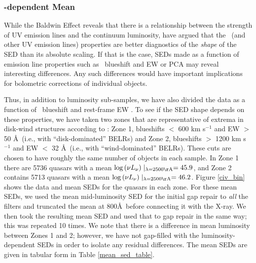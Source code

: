 \subsubsection{\civ-dependent Mean} \label{CIV SED}

While the Baldwin Effect \citep{Baldwin:1977} reveals that there is a relationship between the strength of UV emission lines and the continuum luminosity, \citet{Richards:2011} have argued that the \civ\ (and other UV emission lines) properties are better diagnostics of the {\em shape} of the SED than its absolute scaling.  If that is the case, SEDs made as a function of emission line properties such as \civ\ blueshift and EW \citep{Richards:2011} or PCA \citep[e.g., ``Eigenvector 1'';][]{Boroson:1992,Brotherton:1999} may reveal interesting differences.  Any such differences would have important implications for bolometric corrections of individual objects.

Thus, in addition to luminosity sub-samples, we have also divided the data as a function of \civ\ blueshift and rest-frame EW \citep{Richards:2011}.  To see if the SED shape depends on these properties, we have taken two zones that are representative of extrema in disk-wind structures according to \citet[][see also \citet{Wang:2011}]{Richards:2011}
:  Zone 1, blueshifts $<$ 600 km s$^{-1}$ and EW $>$ 50 \AA\ (i.e., with ``disk-dominated'' BELRs) and Zone 2, blueshifts $>$ 1200 km s$^{-1}$ and EW $<$ 32 \AA\ (i.e., with ``wind-dominated'' BELRs). 
These cuts are chosen to have roughly the same number of objects in each sample.
In Zone 1 there are 5736 quasars with a mean $\log{(\nu L_{\nu})}\mid_{\lambda=2500{\rm \AA}}=45.9$, and Zone 2 contains 5713 quasars with a mean $\log{(\nu L_{\nu})}\mid_{\lambda=2500{\rm \AA}}=46.2$.
Figure \ref{civ_bin} shows the data and mean SEDs for the quasars in each zone.  For these mean SEDs, we used the mean mid-luminosity SED for the initial gap repair to {\em all} the filters and truncated the mean at 800\AA\ before connecting it with the X-ray.  We then took the resulting mean SED and used that to gap repair in the same way; this was repeated 10 times.  We note that there is a difference in mean luminosity between Zones 1 and 2; however, we have not gap-filled with the luminosity-dependent SEDs in order to isolate any residual differences. The mean SEDs are given in tabular form in Table \ref{mean_sed_table}.

